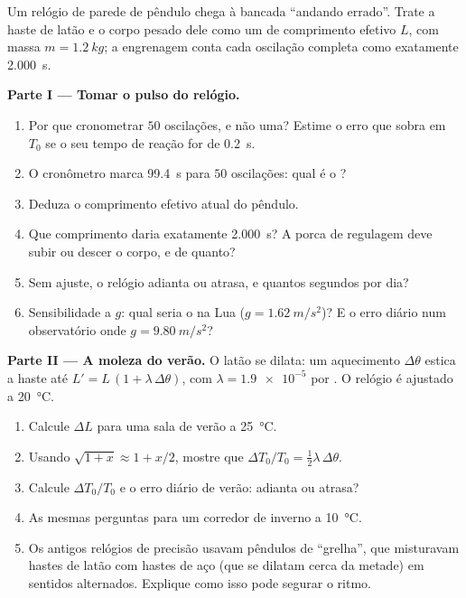 \begin{problem}
\label{pb:g12:oscillators-and-time:1}
Um relógio de parede de pêndulo chega à bancada ``andando errado''. Trate a haste de
latão e o corpo pesado dele como um  de comprimento efetivo $L$, com
massa $m = \qty{1.2}{kg}$; a engrenagem conta cada oscilação completa como exatamente
\qty{2.000}{s}.

\medskip
\noindent\textbf{Parte I --- Tomar o pulso do relógio.}
\begin{enumerate}
  \item Por que cronometrar $50$ oscilações, e não uma? Estime o erro que sobra em
        $T_0$ se o seu tempo de reação for de \qty{0.2}{s}.
  \item O cronômetro marca \qty{99.4}{s} para $50$ oscilações: qual é o ?
  \item Deduza o comprimento efetivo atual do pêndulo.
  \item Que comprimento daria exatamente \qty{2.000}{s}? A porca de regulagem deve
        subir ou descer o corpo, e de quanto?
  \item Sem ajuste, o relógio adianta ou atrasa, e quantos segundos por dia?
  \item Sensibilidade a $g$: qual seria o  na Lua ($g = \qty{1.62}{m/s^2}$)? E o
        erro diário num observatório onde $g = \qty{9.80}{m/s^2}$?
\end{enumerate}

\medskip
\noindent\textbf{Parte II --- A moleza do verão.} O latão se dilata: um aquecimento
$\Delta\theta$ estica a haste até $L' = L\,(1 + \lambda\, \Delta\theta)$, com
$\lambda = \num{1.9e-5}$ por . O relógio é ajustado a \qty{20}{\celsius}.
\begin{enumerate}[resume]
  \item Calcule $\Delta L$ para uma sala de verão a \qty{25}{\celsius}.
  \item Usando $\sqrt{1+x} \approx 1 + x/2$, mostre que
        $\Delta T_0 / T_0 = \tfrac12 \lambda\, \Delta\theta$.
  \item Calcule $\Delta T_0/T_0$ e o erro diário de verão: adianta ou atrasa?
  \item As mesmas perguntas para um corredor de inverno a \qty{10}{\celsius}.
  \item Os antigos relógios de precisão usavam pêndulos de ``grelha'', que misturavam
        hastes de latão com hastes de aço (que se dilatam cerca da metade) em sentidos
        alternados. Explique como isso pode segurar o ritmo.
\end{enumerate}


\end{problem}
